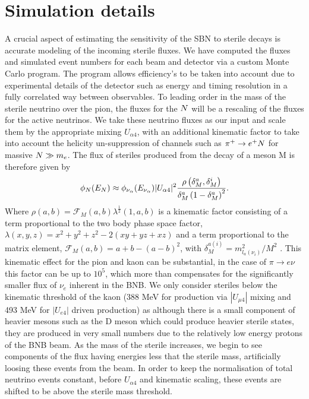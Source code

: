 \documentclass[11pt, a4paper]{article}
\def\ster{\ensuremath N}
\begin{document}
\section{Simulation details}

A crucial aspect of estimating the sensitivity of the SBN to sterile decays is
accurate modeling of the incoming sterile fluxes. We have computed the fluxes
and simulated event numbers for each beam and detector via a custom Monte Carlo
program. The program allows efficiency's to be taken into account due to
experimental details of the detector such as energy and timing resolution in a
fully correlated way between observables. To leading order in the mass of the
sterile neutrino over the pion, the fluxes for the $\ster$ will be a rescaling
of the fluxes for the active neutrinos.  We take these neutrino fluxes as our
input and scale them by the appropriate mixing $U_{\alpha 4}$, with an
additional kinematic factor to take into account the helicity un-suppression of
channels such as $\pi^+ \rightarrow e^+\ster$ for massive $\ster \gg m_e$. The
flux of steriles produced from the decay of a meson M is therefore given by
%
\[
	\phi_{\ster}(E_{\ster}) \approx \phi_{\nu_\alpha} (E_{\nu_\alpha})\vert U_{\alpha 4}\vert^2 \frac{\rho\left( \delta_M^a , \delta_M^i \right)}{\delta_M^a \left(1- \delta_M^a\right)^2}.
\]
%
Where $\rho(a,b)=\mathcal{F}_M(a,b) \lambda^{\frac{1}{2}}(1,a,b)$ is a
kinematic factor consisting of a term proportional to the two body phase space
factor, $\lambda(x,y,z)=x^2+y^2+z^2-2(x y+yz+x z)$ and a term proportional to
the matrix element, $\mathcal{F}_M(a,b)= a+b -\left(a-b\right)^2$, with
$\delta_M^{a(i)}=m_{l_a(\nu_i)}^2/M^2$ \cite{PhysRevD.24.1232}. This kinematic
effect for the pion and kaon can be substantial, in the case of $\pi
\rightarrow e \nu$ this factor can be up to $10^5$, which more than compensates
for the significantly smaller flux of $\nu_e$  inherent in the BNB. We only
consider steriles below the kinematic threshold of the kaon (388 MeV for
production via $|U_{\mu4}|$ mixing and 493 MeV for $|U_{e4}|$ driven
production) as although there is a small component of heavier mesons such as
the D meson which could produce heavier sterile states, they are produced in
very small numbers due to the relatively low energy protons of the BNB beam. As
the mass of the sterile increases, we begin to see components of the flux
having energies less that the sterile mass, artificially loosing these events
from the beam. In order to keep the normalisation of total neutrino events
constant, before $U_{\alpha 4}$ and kinematic scaling, these events are shifted
to be above the sterile mass threshold. \\
\end{document}
